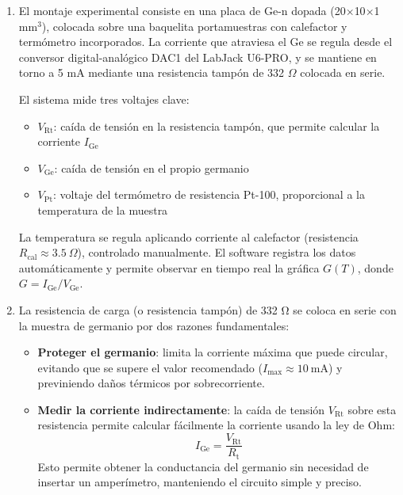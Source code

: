 \begin{enumerate}[label=\alph*)]

	\item El montaje experimental consiste en una placa de Ge-n dopada (20$\times$10$\times$1 mm$^3$), colocada sobre una baquelita portamuestras con calefactor y termómetro incorporados. La corriente que atraviesa el Ge se regula desde el conversor digital-analógico DAC1 del LabJack U6-PRO, y se mantiene en torno a 5 mA mediante una resistencia tampón de 332 $\Omega$ colocada en serie.

	      El sistema mide tres voltajes clave:
	      \begin{itemize}
		      \item \( V_{\text{Rt}} \): caída de tensión en la resistencia tampón, que permite calcular la corriente \( I_{\text{Ge}} \)
		      \item \( V_{\text{Ge}} \): caída de tensión en el propio germanio
		      \item \( V_{\text{Pt}} \): voltaje del termómetro de resistencia Pt-100, proporcional a la temperatura de la muestra
	      \end{itemize}

	      La temperatura se regula aplicando corriente al calefactor (resistencia \( R_{\text{cal}} \approx 3.5\ \Omega \)), controlado manualmente. El software registra los datos automáticamente y permite observar en tiempo real la gráfica \( G(T) \), donde \( G = I_{\text{Ge}} / V_{\text{Ge}} \).

	\item La resistencia de carga (o resistencia tampón) de 332 Ω se coloca en serie con la muestra de germanio por dos razones fundamentales:

	      \begin{itemize}
		      \item \textbf{Proteger el germanio}: limita la corriente máxima que puede circular, evitando que se supere el valor recomendado (\( I_{\text{max}} \approx 10\ \text{mA} \)) y previniendo daños térmicos por sobrecorriente.
		      \item \textbf{Medir la corriente indirectamente}: la caída de tensión \( V_{\text{Rt}} \) sobre esta resistencia permite calcular fácilmente la corriente usando la ley de Ohm:
		            \[
			            I_{\text{Ge}} = \frac{V_{\text{Rt}}}{R_{\text{t}}}
		            \]
		            Esto permite obtener la conductancia del germanio sin necesidad de insertar un amperímetro, manteniendo el circuito simple y preciso.
	      \end{itemize}


\end{enumerate}
